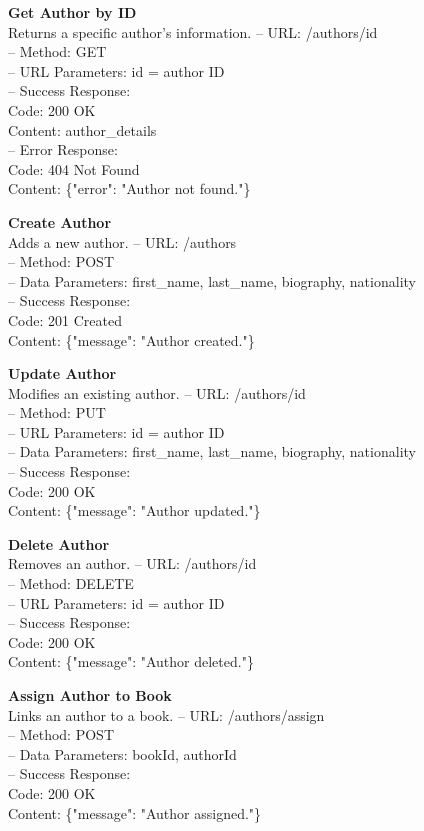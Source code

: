 \textbf{Get Author by ID} \\
Returns a specific author's information.
– URL: /authors/{id} \\
– Method: GET \\
– URL Parameters: id = author ID \\
– Success Response: \\
Code: 200 OK \\
Content: {author_details} \\
– Error Response: \\
Code: 404 Not Found \\
Content: \{"error": "Author not found."\}

\textbf{Create Author} \\
Adds a new author.
– URL: /authors \\
– Method: POST \\
– Data Parameters: first_name, last_name, biography, nationality \\
– Success Response: \\
Code: 201 Created \\
Content: \{"message": "Author created."\}

\textbf{Update Author} \\
Modifies an existing author.
– URL: /authors/{id} \\
– Method: PUT \\
– URL Parameters: id = author ID \\
– Data Parameters: first_name, last_name, biography, nationality \\
– Success Response: \\
Code: 200 OK \\
Content: \{"message": "Author updated."\}

\textbf{Delete Author} \\
Removes an author.
– URL: /authors/{id} \\
– Method: DELETE \\
– URL Parameters: id = author ID \\
– Success Response: \\
Code: 200 OK \\
Content: \{"message": "Author deleted."\}

\textbf{Assign Author to Book} \\
Links an author to a book.
– URL: /authors/assign \\
– Method: POST \\
– Data Parameters: bookId, authorId \\
– Success Response: \\
Code: 200 OK \\
Content: \{"message": "Author assigned."\}

